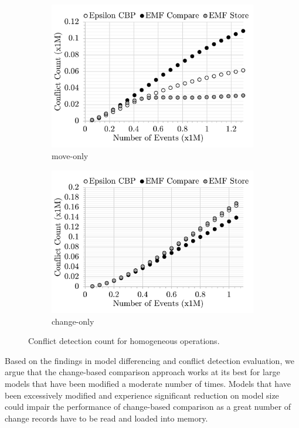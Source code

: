 \begin{figure}[ht]
\begin{subfigure}[t]{0.245\linewidth}
        \includegraphics[width=\linewidth]{move-conflict-count-events}
        \caption{move-only}
        \label{fig:move-conflict-count-events}
    \end{subfigure}
    \hfill
    \begin{subfigure}[t]{0.245\linewidth}
        \includegraphics[width=\linewidth]{change-conflict-count-events}
        \caption{change-only}
        \label{fig:change-conflict-count-events}
    \end{subfigure}
    \caption{Conflict detection count for homogeneous operations.}
    \label{fig:homgeneous_operation_count_events}
\end{figure}

Based on the findings in model differencing and conflict detection evaluation, we argue that the change-based comparison approach works at its best for large models that have been modified a moderate number of times. Models that have been excessively modified and experience significant reduction on model size could impair the performance of change-based comparison as a great number of change records have to be read and loaded into memory. 

